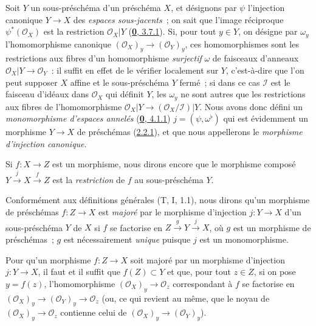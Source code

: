 \begin{env}[4.1.7]
\label{I.4.1.7-fr}
Soit $Y$ un sous-préschéma d'un préschéma $X$, et désignons par $\psi$
l'injection canonique $Y\to X$ des \emph{espaces sous-jacents}~; on sait que
l'image réciproque $\psi^*(\mathscr{O}_X)$ est la restriction
$\mathscr{O}_X|Y$ (\hyperref[0.3.7.1-fr]{\textbf{0}, 3.7.1}). Si, pour tout $y\in Y$,
on désigne par $\omega_y$ l'homomorphisme canonique
$(\mathscr{O}_X)_y\to(\mathscr{O}_Y)_y$, ces homomorphismes sont les
restrictions aux fibres d'un homomorphisme \emph{surjectif} $\omega$ de
faisceaux d'anneaux $\mathscr{O}_X|Y\to\mathscr{O}_Y$~: il suffit en effet de
le vérifier localement sur $Y$, c'est-à-dire que l'on peut supposer $X$
affine et le sous-préschéma $Y$ fermé~; si dans ce cas $\mathscr{I}$ est le
faisceau d'idéaux dans $\mathscr{O}_X$ qui définit $Y$, les $\omega_y$ ne sont
autres que les restrictions aux fibres de l'homomorphisme
$\mathscr{O}_X|Y\to(\mathscr{O}_X/\mathscr{I})|Y$.
Nous avons donc défini un \emph{monomorphisme d'espaces annelés}
(\hyperref[0.4.1.1-fr]{\textbf{0}, 4.1.1}) $j=(\psi,\omega^\flat)$ qui est évidemment un
morphisme $Y\to X$ de préschémas (\hyperref[I.2.2.1-fr]{2.2.1}), et que nous
appellerons le \emph{morphisme d'injection canonique}.

Si $f:X\to Z$ est un morphisme, nous dirons encore que le morphisme composé
$Y\xrightarrow{j}X\xrightarrow{f}Z$ est la \emph{restriction} de $f$ au
sous-préschéma $Y$.
\end{env}

\begin{env}[4.1.8]
\label{I.4.1.8-fr}
Conformément aux définitions générales (T, I, 1.1), nous dirons qu'un
morphisme de préschémas $f:Z\to X$ est \emph{majoré} par le morphisme
d'injection $j:Y\to X$ d'un sous-préschéma $Y$ de $X$ si $f$ se factorise en
$Z\xrightarrow{g}Y\xrightarrow{j}X$, où $g$ est un morphisme de préschémas~;
$g$ est nécessairement \emph{unique} puisque $j$ est un monomorphisme.
\end{env}

\begin{proposition}[4.1.9]
\label{I.4.1.9-fr}
Pour qu'un morphisme $f:Z\to X$ soit majoré par un morphisme
d'injection $j:Y\to X$, il faut et il suffit que $f(Z)\subset Y$ et que,
pour tout $z\in Z$, si on pose $y=f(z)$, l'homomorphisme
$(\mathscr{O}_X)_y\to\mathscr{O}_z$ correspondant à $f$ se factorise en
$(\mathscr{O}_X)_y\to(\mathscr{O}_Y)_y\to\mathscr{O}_z$ (\textup{ou, ce qui revient
au même, que} le noyau de $(\mathscr{O}_X)_y\to\mathscr{O}_z$ contienne celui
de $(\mathscr{O}_X)_y\to(\mathscr{O}_Y)_y$).
\end{proposition}

